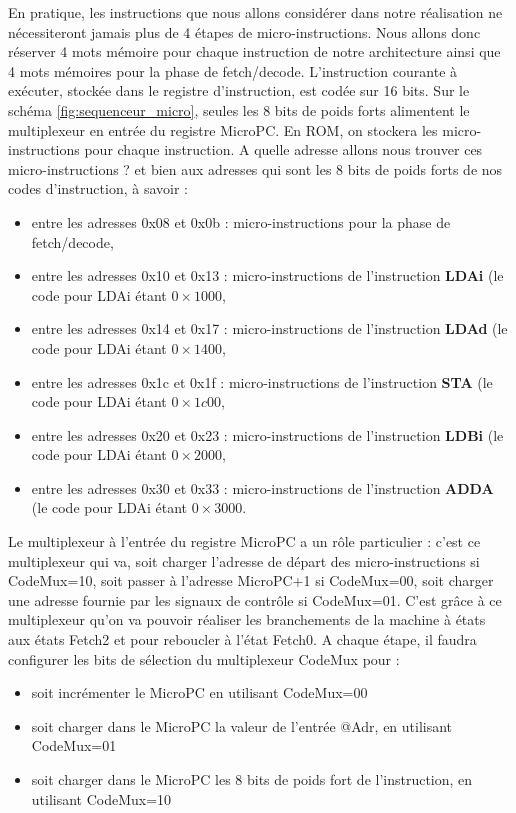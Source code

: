 En pratique, les instructions que nous allons considérer dans notre réalisation ne nécessiteront jamais plus de 4 étapes de micro-instructions. Nous allons donc réserver 4 mots mémoire pour chaque instruction de notre architecture ainsi que 4 mots mémoires pour la phase de fetch/decode. L'instruction courante à exécuter, stockée dans le registre d'instruction, est codée sur 16 bits. Sur le schéma \ref{fig:sequenceur_micro}, seules les 8 bits de poids forts alimentent le multiplexeur en entrée du registre MicroPC. En ROM, on stockera les micro-instructions pour chaque instruction. A quelle adresse allons nous trouver ces micro-instructions ? et bien aux adresses qui sont les 8 bits de poids forts de nos codes d'instruction, à savoir : 
\begin{itemize}
\item entre les adresses 0x08 et 0x0b : micro-instructions pour la phase de fetch/decode,
\item entre les adresses 0x10 et 0x13 : micro-instructions de l'instruction \textbf{LDAi} (le code pour LDAi étant $0\times1000$,
\item entre les adresses 0x14 et 0x17 : micro-instructions de l'instruction \textbf{LDAd} (le code pour LDAi étant $0\times1400$,
\item entre les adresses 0x1c et 0x1f : micro-instructions de l'instruction \textbf{STA} (le code pour LDAi étant $0\times1c00$,
\item entre les adresses 0x20 et 0x23 : micro-instructions de l'instruction \textbf{LDBi} (le code pour LDAi étant $0\times2000$,
\item entre les adresses 0x30 et 0x33 : micro-instructions de l'instruction \textbf{ADDA} (le code pour LDAi étant $0\times3000$.
\end{itemize}
Le multiplexeur à l'entrée du registre MicroPC a un rôle particulier : c'est ce multiplexeur qui va, soit charger l'adresse de départ des micro-instructions si CodeMux=10, soit passer à l'adresse MicroPC+1 si CodeMux=00, soit charger une adresse fournie par les signaux de contrôle si CodeMux=01. C'est grâce à ce multiplexeur qu'on va pouvoir réaliser les branchements de la machine à états aux états Fetch2 et pour reboucler à l'état Fetch0. A chaque étape, il faudra configurer les bits de sélection du multiplexeur CodeMux pour :
\begin{itemize}
\item soit incrémenter le MicroPC en utilisant CodeMux=00
\item soit charger dans le MicroPC la valeur de l'entrée @Adr, en utilisant CodeMux=01
\item soit charger dans le MicroPC les 8 bits de poids fort de l'instruction, en utilisant CodeMux=10
\end{itemize}

